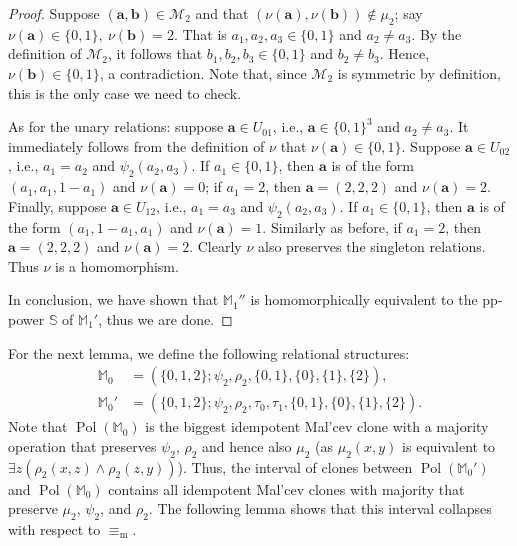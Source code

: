 \documentclass[12pt]{amsart}
\theoremstyle{definition}
\theoremstyle{definition}
\newcommand{\struct}[1]{\mathbb{#1}}
\DeclareMathOperator{\Pol}{Pol}
\newcommand{\minorequivalentto}{\equiv_{\mathrm{m}}}
\begin{document}
\begin{proof}
Suppose $(\boldsymbol{a},\boldsymbol{b})\in \mathcal M_2$ and that $(\nu(\boldsymbol{a}),\nu(\boldsymbol{b}))\notin\mu_2$; say $\nu(\boldsymbol{a})\in\{0,1\},\ \nu(\boldsymbol{b})=2$. That is $a_1,a_2,a_3\in\{0,1\}$ and $a_2\neq a_3$. By the definition of $\mathcal M_2$, it follows that $b_1,b_2,b_3\in\{0,1\}$ and $b_2\neq b_3$. Hence, $\nu(\boldsymbol{b})\in\{0,1\}$, a contradiction. Note that, since $\mathcal M_2$ is symmetric by definition, this is the only case we need to check.

As for the unary relations: suppose $\boldsymbol{a}\in U_{01}$, i.e., $\boldsymbol{a}\in\{0,1\}^3$ and $a_2\neq a_3$. It immediately follows from the definition of $\nu$ that $\nu(\boldsymbol{a})\in\{0,1\}$. Suppose $\boldsymbol{a}\in U_{02}$, i.e., $a_1=a_2$ and $\psi_2(a_2,a_3)$. If $a_1\in\{0,1\}$, then $\boldsymbol{a}$ is of the form $(a_1,a_1,1-a_1)$ and $\nu(\boldsymbol{a})=0$; if $a_1=2$, then $\boldsymbol{a}=(2,2,2)$ and $\nu(\boldsymbol{a})=2$. Finally, suppose $\boldsymbol{a}\in U_{12}$, i.e., $a_1=a_3$ and $\psi_2(a_2,a_3)$. If $a_1\in\{0,1\}$, then $\boldsymbol{a}$ is of the form $(a_1,1-a_1,a_1)$ and $\nu(\boldsymbol{a})=1$. Similarly as before, if $a_1=2$, then $\boldsymbol{a}=(2,2,2)$ and $\nu(\boldsymbol{a})=2$. Clearly $\nu$ also preserves the singleton relations. Thus $\nu$ is a homomorphism.

In conclusion, we have shown that $\mathbb M_1''$ is homomorphically equivalent to the pp-power $\mathbb S$ of $\mathbb M_1'$, thus we are done.
\end{proof}


For the next lemma, we define the following relational structures:
\begin{align*}
    \struct{M}_0 &= (\{0,1,2\};\psi_2,\rho_2,\{0,1\},\{0\},\{1\},\{2\}),
    \\\struct{M}_0' &= (\{0,1,2\};\psi_2,\rho_2,\tau_0,\tau_1,\{0,1\},\{0\},\{1\},\{2\}).
\end{align*}
 Note that $\Pol(\struct{M}_0)$ is the biggest idempotent Mal'cev clone with a majority operation that preserves $\psi_2$, $\rho_2$ and hence also $\mu_2$ (as $\mu_2(x,y)$ is equivalent to $\exists z (\rho_2(x,z) \land \rho_2(z,y))$). Thus, the interval of clones between $\Pol(\struct{M}_0')$ and $\Pol(\struct{M}_0)$ contains all idempotent Mal'cev clones with majority that preserve $\mu_2$, $\psi_2$, and $\rho_2$. The following lemma shows that this interval collapses with respect to $\minorequivalentto$.
\end{document}
